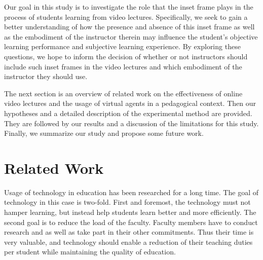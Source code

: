 \documentclass{sigchi}
\begin{document}
Our goal in this study is to investigate the role that the inset frame plays in the process of students learning from video lectures. Specifically, we seek to gain a better understanding of how the presence and absence of this inset frame as well as the embodiment of the instructor therein may influence the student's objective learning performance and subjective learning experience. By exploring these questions, we hope to inform the decision of whether or not instructors should include such inset frames in the video lectures and which embodiment of the instructor they should use.

The next section is an overview of related work on the effectiveness of online video lectures and the usage of virtual agents in a pedagogical context. Then our hypotheses and a detailed description of the experimental method are provided. They are followed by our results and a discussion of the limitations for this study. Finally, we summarize our study and propose some future work.




\section{Related Work}
Usage of technology in education has been researched for a long time. The goal of technology in this case is two-fold. First and foremost, the technology must not hamper learning, but instead help students learn better and more efficiently. The second goal is to reduce the load of the faculty. Faculty members have to conduct research and as well as take part in their other commitments. Thus their time is very valuable, and technology should enable a reduction of their teaching duties per student while maintaining the quality of education.
\end{document}
